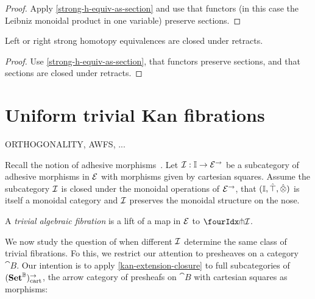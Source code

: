 \documentclass[reqno,10pt,a4paper,oneside]{amsart}
\begin{document}
\begin{proof}
Apply \cref{strong-h-equiv-as-section} and use that functors (in this case the Leibniz monoidal product in one variable) preserve sections.
\end{proof}

\begin{proposition}
\label{strong-h-equiv-closed-under-retract}
Left or right strong homotopy equivalences are closed under retracts.
\end{proposition}

\begin{proof}
Use \cref{strong-h-equiv-as-section},  that functors preserve sections, and that  sections are closed under retracts.
\end{proof}


\section{Uniform trivial Kan fibrations} 

ORTHOGONALITY, AWFS, ...

Recall the notion of adhesive morphisms~\cite{garner-lack:adhesive}.
Let $\cal{I} : \cat{I} \to \catE^{\to}$ be a subcategory of adhesive morphisms in $\catE$ with morphisms given by cartesian squares.
Assume the subcategory $\cal{I}$ is closed under the monoidal operations of $\catE^{\to}$, \ie that $(\cat{I}, \hatunit, \hatotimes)$ is itself a monoidal category and $\cal{I}$ preserves the monoidal structure on the nose.

\begin{definition} A \emph{trivial algebraic fibration} is a lift of a map in $\catE$ to $\liftr{\cal{I}}$.
\end{definition} 


We now study the question of when different $\cal{I}$ determine the same class of trivial fibrations. Fo this, we restrict our
attention to  presheaves on a category $\cat{B}$.
Our intention is to apply \cref{kan-extension-closure} to full subcategories of $(\Set^{\cat{B}})_{\cart}^{\to}$, the arrow category of presheafs on $\cat{B}$ with cartesian squares as morphisms:
\end{document}
